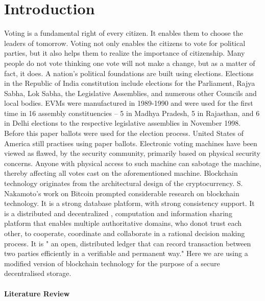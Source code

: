 \documentclass{article}
\begin{document}
\section{Introduction}
Voting is a fundamental right of every citizen. It enables them to choose the leaders of tomorrow. Voting not only enables the citizens to vote for political parties, but it also helps them to realize the importance of citizenship. Many people do not vote thinking one vote will not make a change, but as a matter of fact, it does. A nation’s political foundations are built using elections.\cite{blais1999people}   Elections in the Republic of India constitution include elections for the Parliament, Rajya Sabha, Lok Sabha, the Legislative Assemblies, and numerous other Councils and local bodies. EVMs were manufactured in 1989-1990 and were used for the first time in 16 assembly constituencies -- 5 in Madhya Pradesh, 5 in Rajasthan, and 6 in Delhi elections to the respective legislative assemblies in November 1998. Before this paper ballots were used for the election process. United States of America still practises using paper ballots. Electronic voting machines have been viewed as flawed, by the security community, primarily based on physical security concerns. Anyone with physical access to such machine can sabotage the machine, thereby affecting all votes cast on the aforementioned machine.\cite{hjalmarsson2018blockchain} Blockchain technology originates from the  architectural design of the cryptocurrency. S. Nakamoto's work on Bitcoin \cite{nakamoto2008bitcoin} prompted considerable research on blockchain technology.  It is a strong database platform, with strong consistency support. It is a distributed and decentralized , computation and information sharing platform that enables multiple authoritative domains, who donot trust each other, to cooperate, coordinate and collaborate in a rational decision making process. It is " an open, distributed ledger that can record transaction between two parties efficiently in a verifiable and permanent way.\cite{iansiti2017truth}" Here we are using a modified version of blockchain technology for the purpose of a secure decentralised storage. \\
\\
\textbf{Literature Review}
\end{document}
